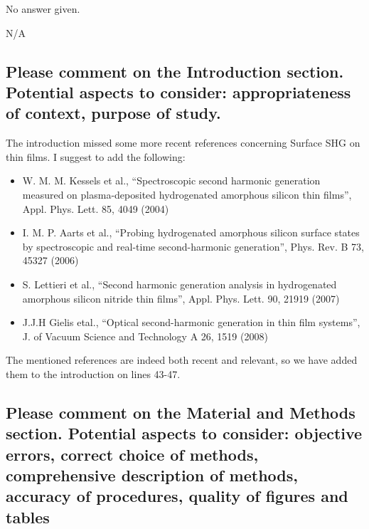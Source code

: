 \documentclass{article}
\begin{document}
No answer given.

\begin{shaded}
N/A
\end{shaded}


\subsection{Please comment on the Introduction section. Potential aspects to
consider: appropriateness of context, purpose of study.}

The introduction missed some more recent references concerning Surface SHG on
thin films. I suggest to add the following:

\begin{itemize}
\item W. M. M. Kessels et al., ``Spectroscopic second harmonic generation
measured on plasma-deposited hydrogenated amorphous silicon thin films'', Appl.
Phys. Lett. 85, 4049 (2004)
\item I. M. P. Aarts et al., ``Probing hydrogenated amorphous silicon surface
states by spectroscopic and real-time second-harmonic generation'', Phys. Rev. B
73, 45327 (2006)
\item S. Lettieri et al., ``Second harmonic generation analysis in hydrogenated
amorphous silicon nitride thin films'', Appl. Phys. Lett. 90, 21919 (2007)
\item J.J.H Gielis etal., ``Optical second-harmonic generation in thin film 
systems'', J. of Vacuum Science and Technology A 26, 1519 (2008)
\end{itemize}

\begin{shaded}
The mentioned references are indeed both recent and relevant, so we have added them to the introduction on lines 43-47.
\end{shaded}


\subsection{Please comment on the Material and Methods section. Potential
aspects to consider: objective errors, correct choice of methods, comprehensive
description of methods, accuracy of procedures, quality of figures and tables}
\end{document}

